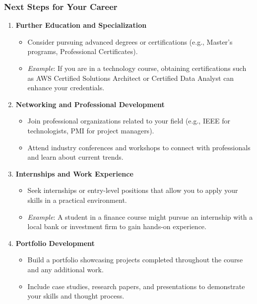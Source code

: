 \documentclass[aspectratio=169]{beamer}
\begin{document}
\begin{frame}[fragile]
    \frametitle{Next Steps for Your Career}
    \begin{enumerate}
        \item \textbf{Further Education and Specialization}
        \begin{itemize}
            \item Consider pursuing advanced degrees or certifications (e.g., Master’s programs, Professional Certificates).
            \item \textit{Example}: If you are in a technology course, obtaining certifications such as AWS Certified Solutions Architect or Certified Data Analyst can enhance your credentials.
        \end{itemize}
        
        \item \textbf{Networking and Professional Development}
        \begin{itemize}
            \item Join professional organizations related to your field (e.g., IEEE for technologists, PMI for project managers).
            \item Attend industry conferences and workshops to connect with professionals and learn about current trends.
        \end{itemize}
        
        \item \textbf{Internships and Work Experience}
        \begin{itemize}
            \item Seek internships or entry-level positions that allow you to apply your skills in a practical environment.
            \item \textit{Example}: A student in a finance course might pursue an internship with a local bank or investment firm to gain hands-on experience.
        \end{itemize}
        
        \item \textbf{Portfolio Development}
        \begin{itemize}
            \item Build a portfolio showcasing projects completed throughout the course and any additional work.
            \item Include case studies, research papers, and presentations to demonstrate your skills and thought process.
        \end{itemize}
    \end{enumerate}
\end{frame}
\end{document}
